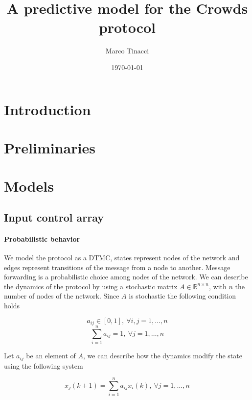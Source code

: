 \documentclass[a4paper, 11pt]{article}
\theoremstyle{definition}
\theoremstyle{remark}
\begin{document}
\title{A predictive model for the Crowds protocol}
\date{\today}
\author{Marco Tinacci}
\maketitle

\section{Introduction}

\section{Preliminaries}

\section{Models}

\subsection{Input control array} \label{subs:inputcontrol}

\paragraph{Probabilistic behavior}
We model the protocol as a DTMC, states represent nodes of the network and edges represent transitions of the message from a node to another. Message forwarding is a probabilistic choice among nodes of the network. We can describe the dynamics of the protocol by using a stochastic matrix $A \in \mathbb{R}^{n\times n}$, with $n$ the number of nodes of the network. Since $A$ is stochastic the following condition holds

\begin{equation} \label{eq:stoc1}
a_{ij} \in [0,1],\ \forall i,j = 1,\dots,n
\end{equation}
\begin{equation} \label{eq:stoc2}
\sum_{i=1}^n a_{ij} = 1,\ \forall j = 1,\dots,n
\end{equation}

Let $a_{ij}$ be an element of $A$, we can describe how the dynamics modify the state using the following system

\begin{equation} \label{eq:system}
	x_j(k+1) = \sum_{i=1}^n a_{ij} x_i(k), \ \forall j = 1,\dots,n
\end{equation}
\end{document}
